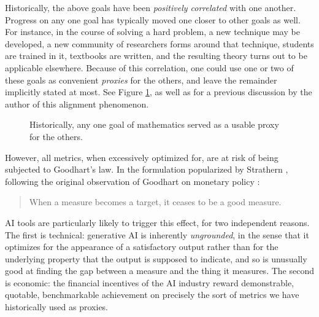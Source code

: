 \documentclass[12pt]{amsart}
\theoremstyle{definition}
\begin{document}
Historically, the above goals have been \emph{positively correlated} with one another.  Progress on any one goal has typically moved one closer to other goals as well.  For instance, in the course of solving a hard problem, a new technique may be developed, a new community of researchers forms around that technique, students are trained in it, textbooks are written, and the resulting theory turns out to be applicable elsewhere.  Because of this correlation, one could use one or two of these goals as convenient \emph{proxies} for the others, and leave the remainder implicitly stated at most.  See Figure \ref{aligned}, as well as \cite{tao-good} for a previous discussion by the author of this alignment phenomenon.

\begin{figure}[h]
\centering
{}
\caption{Historically, any one goal of mathematics served as a usable proxy for the others.}\label{aligned}
\end{figure}

However, all metrics, when excessively optimized for, are at risk of being subjected to Goodhart's law.  In the formulation popularized by Strathern \cite{strathern}, following the original observation of Goodhart on monetary policy \cite{goodhart}:

\begin{quote}
When a measure becomes a target, it ceases to be a good measure.
\end{quote}

AI tools are particularly likely to trigger this effect, for two independent reasons.  The first is technical: generative AI is inherently \emph{ungrounded}, in the sense that it optimizes for the appearance of a satisfactory output rather than for the underlying property that the output is supposed to indicate, and so is unusually good at finding the gap between a measure and the thing it measures.  The second is economic: the financial incentives of the AI industry reward demonstrable, quotable, benchmarkable achievement on precisely the sort of metrics we have historically used as proxies.
\end{document}
